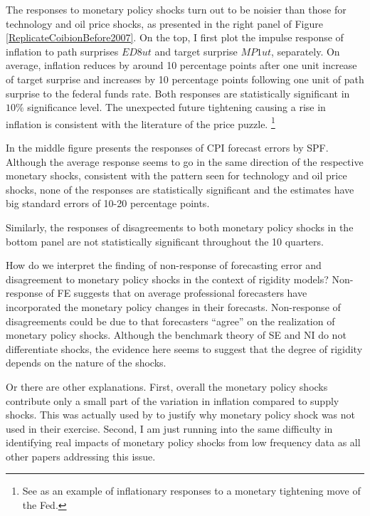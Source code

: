 \documentclass[12pt]{article}
\begin{document}
	The responses to monetary policy shocks turn out to be noisier than those for technology and oil price shocks, as presented in the right panel of Figure \ref{ReplicateCoibionBefore2007}. On the top, I first plot the impulse response of inflation to path surprises $ED8ut$ and target surprise $MP1ut$, separately. On average, inflation reduces by around 10 percentage points after one unit increase of target surprise and increases by 10 percentage points following one unit of path surprise to the federal funds rate. Both responses are  statistically significant in $10\%$  significance level. The unexpected future tightening causing a rise in inflation is consistent with the literature of the price puzzle. \footnote{See \cite{nakamura2018high} as an example of inflationary responses to a monetary tightening move of the Fed.}
	
	In the middle figure presents the responses of CPI forecast errors by SPF.  Although the average response seems to go in the same direction of the respective monetary shocks, consistent with the pattern seen for technology and oil price shocks, none of the responses are statistically significant and the estimates have big standard errors of 10-20 percentage points.  
	
	Similarly, the responses of disagreements to both monetary policy shocks in the bottom panel are not statistically significant throughout the 10 quarters.  
	
	How do we interpret the finding of non-response of forecasting error and disagreement to monetary policy shocks in the context of rigidity models? Non-response of FE suggests that on average professional forecasters have incorporated the monetary policy changes in their forecasts. Non-response of disagreements could be due to that forecasters ``agree'' on the realization of monetary policy shocks. Although the benchmark theory of SE and NI do not differentiate shocks, the evidence here seems to suggest that the degree of rigidity depends on the nature of the shocks. 
	
	Or there are other explanations.  First, overall the monetary policy shocks contribute only a small part of the variation in inflation compared to supply shocks. This was actually used by \cite{coibion2012can} to justify why monetary policy shock was not used in their exercise.  Second,  I am just running into the same difficulty in identifying real impacts of monetary policy shocks from low frequency data as all other papers addressing this issue. 
	
\end{document}

